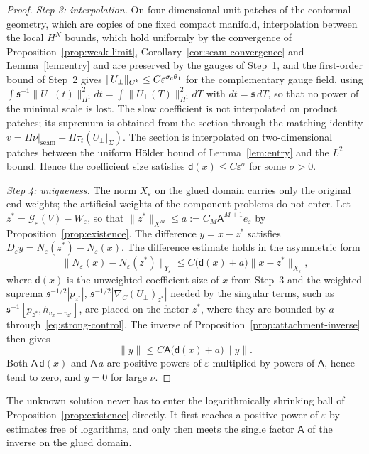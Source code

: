 \documentclass[11pt]{amsart}
\theoremstyle{definition}
\theoremstyle{remark}
\theoremstyle{plain}
\numberwithin{equation}{section}
\newcommand{\cG}{\mathcal{G}}
\newcommand{\eps}{\varepsilon}
\begin{document}
\begin{proof}
\emph{Step 3: interpolation.} On four-dimensional unit patches of the
conformal geometry, which are copies of one fixed compact manifold,
interpolation between the local $H^N$ bounds, which hold uniformly by the
convergence of Proposition~\ref{prop:weak-limit},
Corollary~\ref{cor:seam-convergence} and Lemma~\ref{lem:entry} and are preserved by the gauges of Step~1, and the
first-order bound of Step~2 gives $\|U_\perp\|_{C^k}\le C\eps^{\sigma_{\rm c}\theta_1}$
for the complementary gauge field, using
$\int{\mathfrak s}^{-1}\|U_\perp(t)\|^2_{H^1}dt=\int\|U_\perp(T)\|^2_{H^1}dT$ with $dt={\mathfrak s}\,dT$,
so that no power of the minimal scale is lost. The slow coefficient is not
interpolated on product patches; its supremum is obtained from the
section through the matching identity $v=\Pi\nu|_{\mathrm{seam}}-
\Pi\tau_t(U_\perp|_\Sigma)$. The section is interpolated on two-dimensional
patches between the uniform Hölder bound of Lemma~\ref{lem:entry} and the
$L^2$ bound. Hence the coefficient size satisfies $\mathsf d(x)\le C\eps^{\sigma}$
for some $\sigma>0$.

\emph{Step 4: uniqueness.} The norm $X_\eps$ on the glued domain carries
only the original end weights; the artificial weights of the component
problems do not enter. Let $z^*=\cG_\eps(V)-W_\eps$, so that
$\|z^*\|_{X^M}\le a:=C_M\mathsf A^{M+1}e_\eps$ by Proposition~\ref{prop:existence}.
The difference $y=x-z^*$ satisfies $D_\eps y=N_\eps(z^*)-N_\eps(x)$. The
difference estimate holds in the asymmetric form
\[
\|N_\eps(x)-N_\eps(z^*)\|_{Y_\eps}\le C\bigl(\mathsf d(x)+a\bigr)\|x-z^*\|_{X_\eps},
\]
where $\mathsf d(x)$ is the unweighted coefficient size of $x$ from Step~3 and
the weighted suprema ${\mathfrak s}^{-1/2}|p_{z^*}|$, ${\mathfrak s}^{-1/2}|\nabla_C(U_\perp)_{z^*}|$ needed by
the singular terms, such as ${\mathfrak s}^{-1}[p_{z^*},h_{v_x-v_{z^*}}]$, are placed on the
factor $z^*$, where they are bounded by $a$ through~\eqref{eq:strong-control}.
The inverse of Proposition~\ref{prop:attachment-inverse} then gives
\[
\|y\|\le C\mathsf A\bigl(\mathsf d(x)+a\bigr)\|y\|.
\]
Both $\mathsf A\,\mathsf d(x)$ and $\mathsf A\,a$ are positive powers of $\eps$ multiplied by powers
of $\mathsf A$, hence tend to zero, and $y=0$ for large $\nu$.
\end{proof}

The unknown solution never has to enter the logarithmically shrinking
ball of Proposition~\ref{prop:existence} directly. It first reaches a
positive power of $\eps$ by estimates free of logarithms, and only then
meets the single factor $\mathsf A$ of the inverse on the glued domain.
\end{document}
